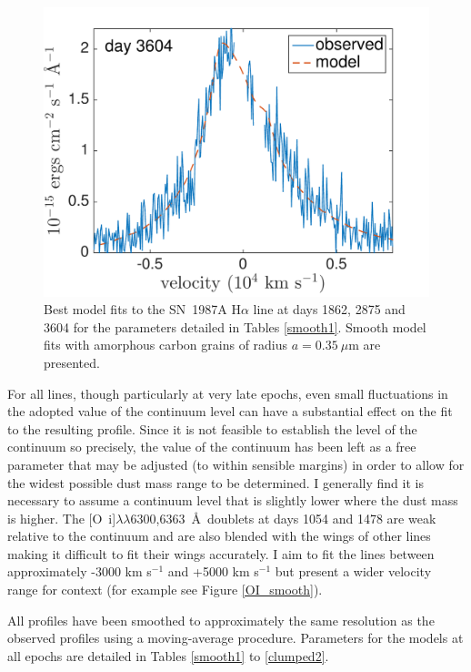 \begin{figure}
\includegraphics[trim =0 0 0 0,clip=true,scale=0.37]{chapters/chapter5/images/smooth/best_fit/d3604Ha.pdf}
\caption{Best model fits to the SN~1987A H$\alpha$ line at days 1862, 2875 and 
3604 for the parameters detailed in Tables \ref{smooth1}.  Smooth model fits with amorphous carbon grains of radius $a=0.35~\mu$m are presented.}
\label{smooth_late}
\end{figure}
For all lines, though particularly at very late epochs, even small 
fluctuations in the adopted value of the continuum level can have a 
substantial effect on the fit to the resulting profile.  Since it is not 
feasible to establish the level of the continuum so precisely, the value 
of the continuum has been left as a free parameter that may be adjusted 
(to within sensible margins) in order to allow for the widest possible 
dust mass range to be determined.  I generally find it is necessary to 
assume a continuum level that is slightly lower where the dust mass is 
higher.  The [O~{\sc i}]$\lambda\lambda$6300,6363~\AA\ doublets at days 1054 and 
1478 are weak relative to the continuum and are also blended with the 
wings of other lines making it difficult to fit their wings accurately.  
I aim to fit the lines between approximately -3000 km s$^{-1}$ and +5000 
km s$^{-1}$ but present a wider velocity range for context (for example 
see Figure \ref{OI_smooth}).


All profiles have been smoothed to approximately the same resolution as 
the observed profiles using a moving-average procedure.  Parameters for 
the models at all epochs are detailed in 
Tables \ref{smooth1} to \ref{clumped2}.


